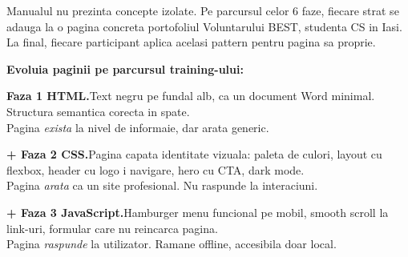 \documentclass[11pt,a4paper]{article}
\begin{document}
Manualul nu prezinta concepte izolate. Pe parcursul celor 6 faze, fiecare strat se adauga la o pagina concreta \textendash{} portofoliul Voluntarului BEST, studenta CS in Iasi. La final, fiecare participant aplica acelasi pattern pentru pagina sa proprie.

\bigskip

\textbf{\sffamily Evoluia paginii pe parcursul training-ului:}

\bigskip

\begin{tcolorbox}[
  enhanced, colback=themeHtml!8, colframe=themeHtml, boxrule=0pt, leftrule=4pt,
  arc=4pt, sharp corners=downhill, rounded corners=northwest,
  left=12pt, right=12pt, top=8pt, bottom=8pt, before skip=4pt, after skip=4pt,
]
\textbf{\color{themeHtml}Faza 1 \textendash{} HTML.}\quad Text negru pe fundal alb, ca un document Word minimal. Structura semantica corecta in spate.\\
{\small\color{textDim} Pagina \emph{exista} la nivel de informaie, dar arata generic.}
\end{tcolorbox}

\begin{tcolorbox}[
  enhanced, colback=themeCss!8, colframe=themeCss, boxrule=0pt, leftrule=4pt,
  arc=4pt, sharp corners=downhill, rounded corners=northwest,
  left=12pt, right=12pt, top=8pt, bottom=8pt, before skip=4pt, after skip=4pt,
]
\textbf{\color{themeCss}+ Faza 2 \textendash{} CSS.}\quad Pagina capata identitate vizuala: paleta de culori, layout cu flexbox, header cu logo i navigare, hero cu CTA, dark mode.\\
{\small\color{textDim} Pagina \emph{arata} ca un site profesional. Nu raspunde la interaciuni.}
\end{tcolorbox}

\begin{tcolorbox}[
  enhanced, colback=themeJs!8, colframe=themeJs, boxrule=0pt, leftrule=4pt,
  arc=4pt, sharp corners=downhill, rounded corners=northwest,
  left=12pt, right=12pt, top=8pt, bottom=8pt, before skip=4pt, after skip=4pt,
]
\textbf{\color{themeJs}+ Faza 3 \textendash{} JavaScript.}\quad Hamburger menu funcional pe mobil, smooth scroll la link-uri, formular care nu reincarca pagina.\\
{\small\color{textDim} Pagina \emph{raspunde} la utilizator. Ramane offline, accesibila doar local.}
\end{tcolorbox}
\end{document}
